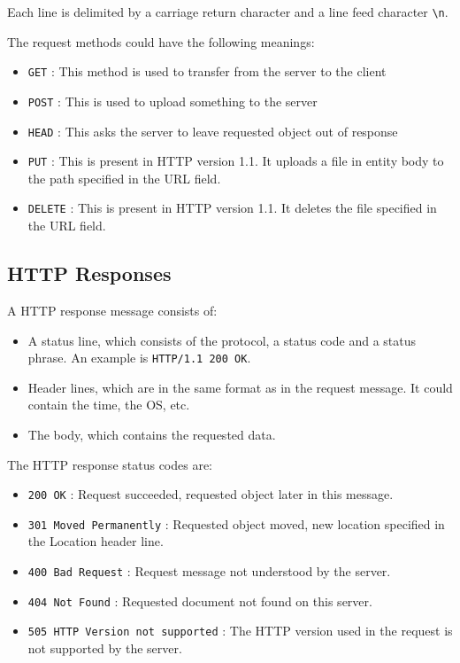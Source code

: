 \documentclass[12pt,letterpaper]{article}
\theoremstyle{definition}
\begin{document}
Each line is delimited by a carriage return character  and a line feed character \texttt{\textbackslash n}.

The request methods could have the following meanings:

\begin{itemize}
  \item \texttt{GET} : This method is used to transfer from the server to the client
  \item \texttt{POST} : This is used to upload something to the server
  \item \texttt{HEAD} : This asks the server to leave requested object out of response
  \item \texttt{PUT} : This is present in HTTP version 1.1. It uploads a file in entity body to the path specified in the URL field.
  \item \texttt{DELETE} : This is present in HTTP version 1.1. It deletes the file specified in the URL field.
\end{itemize}

\subsection{HTTP Responses}

A HTTP response message consists of:

\begin{itemize}
  \item A status line, which consists of the protocol, a status code and a status phrase. An example is \texttt{HTTP/1.1 200 OK}.
  \item Header lines, which are in the same format as in the request message. It could contain the time, the OS, etc.
  \item The body, which contains the requested data.
\end{itemize}

The HTTP response status codes are:

\begin{itemize}
  \item \texttt{200 OK} : Request succeeded, requested object later in this message.
  \item \texttt{301 Moved Permanently} : Requested object moved, new location specified in the Location header line.
  \item \texttt{400 Bad Request} : Request message not understood by the server.
  \item \texttt{404 Not Found} : Requested document not found on this server.
  \item \texttt{505 HTTP Version not supported} : The HTTP version used in the request is not supported by the server.
\end{itemize}
\end{document}

